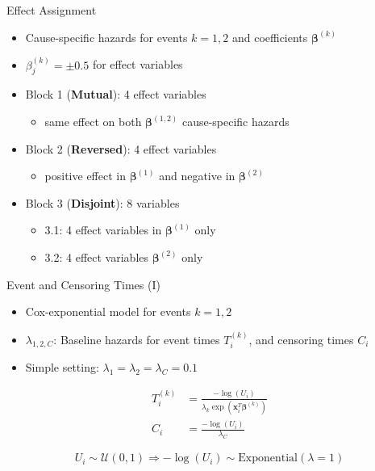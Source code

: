 \documentclass{beamer}
\providecommand{\tightlist}{%
  \setlength{\itemsep}{0pt}\setlength{\parskip}{0pt}}
\begin{document}
\begin{frame}{Effect Assignment}
\protect\hypertarget{effect-assignment}{}
\begin{itemize}
\tightlist
\item
  Cause-specific hazards for events \(k = 1,2\) and coefficients
  \(\pmb{\beta}^{(k)}\)
\item
  \(\beta^{(k)}_j = \pm 0.5\) for effect variables
\end{itemize}

\begin{itemize}
\tightlist
\item
  Block 1 (\textbf{Mutual}): 4 effect variables

  \begin{itemize}
  \tightlist
  \item
    same effect on both \(\pmb{\beta}^{(1,2)}\) cause-specific hazards
  \end{itemize}
\item
  Block 2 (\textbf{Reversed}): 4 effect variables

  \begin{itemize}
  \tightlist
  \item
    positive effect in \(\pmb{\beta}^{(1)}\) and negative in
    \(\pmb{\beta}^{(2)}\)
  \end{itemize}
\item
  Block 3 (\textbf{Disjoint}): 8 variables

  \begin{itemize}
  \tightlist
  \item
    3.1: 4 effect variables in \(\pmb{\beta}^{(1)}\) only
  \item
    3.2: 4 effect variables \(\pmb{\beta}^{(2)}\) only
  \end{itemize}
\end{itemize}
\end{frame}

\begin{frame}{Event and Censoring Times (I)}
\protect\hypertarget{event-and-censoring-times-i}{}
\begin{itemize}
\tightlist
\item
  Cox-exponential model for events \(k = 1,2\)
\item
  \(\lambda_{1,2,C}\): Baseline hazards for event times \(T_i^{(k)}\),
  and censoring times \(C_i\)
\item
  Simple setting: \(\lambda_1 = \lambda_2 = \lambda_C = 0.1\)
\end{itemize}

\begin{align*}
T_i^{(k)} &= \frac{-\log(U_i)}{\lambda_k \exp(\mathbf{x}^{T}_i\pmb{\beta}^{(k)})} \\
C_i       &= \frac{-\log(U_i)}{\lambda_C}
\end{align*}

\[U_i \sim \mathcal{U}(0, 1) \Rightarrow -\log(U_i) \sim \mathrm{Exponential}(\lambda = 1)\]
\end{frame}
\end{document}
